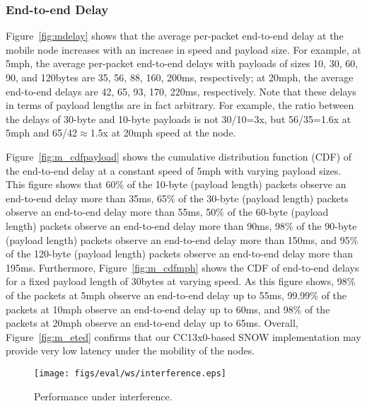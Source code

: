\subsubsection{End-to-end Delay}\label{sec:e2edspeed}
Figure~\ref{fig:mdelay} shows that the average per-packet end-to-end delay at the mobile node increases with an increase in speed and payload size. For example, at 5mph, the average per-packet end-to-end delays with payloads of sizes 10, 30, 60, 90, and 120bytes are 35, 56, 88, 160, 200ms, respectively; at 20mph, the average end-to-end delays are 42, 65, 93, 170, 220ms, respectively. Note that these delays in terms of payload lengths are in fact arbitrary. For example, the ratio between the delays of 30-byte and 10-byte payloads is not 30/10=3x, but 56/35=1.6x at 5mph and 65/42$\approx$1.5x at 20mph speed at the node.

Figure~\ref{fig:m_cdfpayload} shows the cumulative distribution function (CDF) of the end-to-end delay at a constant speed of 5mph with varying payload sizes. This figure shows that 60\% of the 10-byte (payload length) packets observe an end-to-end delay more than 35ms, 65\% of the 30-byte (payload length) packets observe an end-to-end delay more than 55ms, 50\% of the 60-byte (payload length) packets observe an end-to-end delay more than 90ms, 98\% of the 90-byte (payload length) packets observe an end-to-end delay more than 150ms, and 95\% of the 120-byte (payload length) packets observe an end-to-end delay more than 195ms. 
Furthermore, Figure~\ref{fig:m_cdfmph} shows the CDF of end-to-end delays for a fixed payload length of 30bytes at varying speed. As this figure shows, 98\% of the packets at 5mph observe an end-to-end delay up to 55ms, 99.99\% of the packets at 10mph observe an end-to-end delay up to 60ms, and 98\% of the packets at 20mph observe an end-to-end delay up to 65ms. Overall, Figure~\ref{fig:m_eted} confirms that our CC13x0-based SNOW implementation may provide very low latency under the mobility of the nodes.
\begin{figure*}[t]
    \centering
      \hfill %
      \hfill
    \caption{End-to-end delay analysis of mobile node under varying payload length.}
    \label{fig:m_eted}
\end{figure*}
\begin{figure}[!htb]
\centering
\texttt{[image: figs/eval/ws/interference.eps]}
\caption{Performance under interference.}
\label{fig:ws_interf}
\end{figure}
